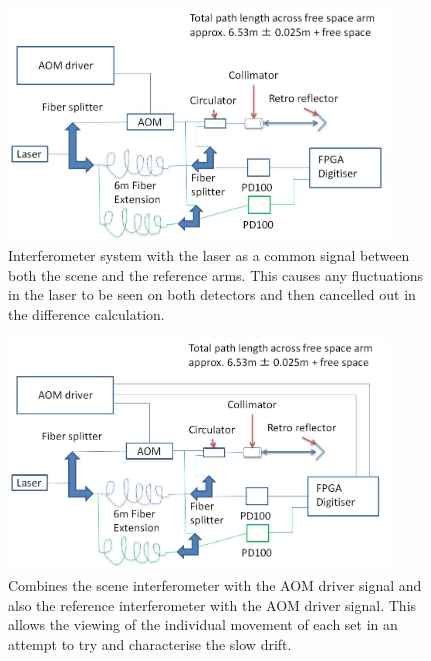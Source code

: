 \documentclass[12pt,a4paper,oneside]{report}
\begin{document}
\begin{figure}[H] 
\includegraphics[width=0.9\textwidth, center,angle=0]{DImages/intconfig3.JPG}
\caption{Interferometer system with the laser as a common signal between both the scene and the reference arms. This causes any fluctuations in the laser to be seen on both detectors and then cancelled out in the difference calculation.}
\label{fig:intconfig3}
\end{figure}
\begin{figure}[H] 
\includegraphics[width=0.9\textwidth, center,angle=0]{DImages/intconfig4.JPG}
\caption{Combines the scene interferometer with the AOM driver signal and also the reference interferometer with the AOM driver signal. This allows the viewing of the individual movement of each set in an attempt to try and characterise the slow drift.}
\label{fig:intconfig4}
\end{figure}



\end{document}
